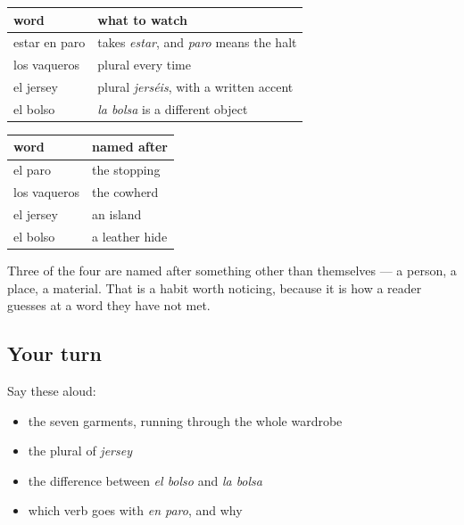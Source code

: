 \begin{grammarlens}[title={Grammar Lens: each one's own trap}]
\noindent
\begin{tabularx}{\linewidth}{@{}>{\raggedright\arraybackslash}X>{\raggedright\arraybackslash}X@{}}
\toprule
\textbf{word} & \textbf{what to watch} \\
\midrule
estar en paro & takes \emph{estar}, and \emph{paro} means the halt \\
los vaqueros & plural every time \\
el jersey & plural \emph{jerséis}, with a written accent \\
el bolso & \emph{la bolsa} is a different object \\
\bottomrule
\end{tabularx}
\end{grammarlens}

\begin{grammarlens}[title={Grammar Lens: where each word came from}]
\noindent
\begin{tabularx}{\linewidth}{@{}>{\raggedright\arraybackslash}X>{\raggedright\arraybackslash}X@{}}
\toprule
\textbf{word} & \textbf{named after} \\
\midrule
el paro & the stopping \\
los vaqueros & the cowherd \\
el jersey & an island \\
el bolso & a leather hide \\
\bottomrule
\end{tabularx}

Three of the four are named after something other than themselves — a person, a place, a material. That is a habit worth noticing, because it is how a reader guesses at a word they have not met.
\end{grammarlens}

\subsection*{Your turn}
Say these aloud:

\begin{itemize}
\raggedright
  \item the seven garments, running through the whole wardrobe
  \item the plural of \emph{jersey}
  \item the difference between \emph{el bolso} and \emph{la bolsa}
  \item which verb goes with \emph{en paro}, and why
\end{itemize}

